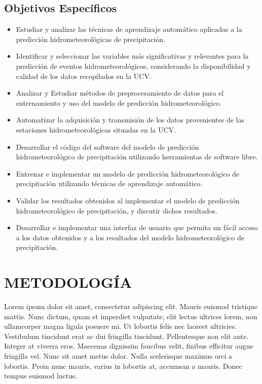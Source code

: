 \documentclass[stu, 12pt, helv, letterpaper, donotrepeattitle, floatsintext, natbib]{apa7}
\begin{document}
\subsection*{Objetivos Específicos}

\begin{itemize}
    \item Estudiar y analizar las técnicas de aprendizaje automático aplicadas a la predicción hidrometeorológicas de precipitación.
    \item Identificar y seleccionar las variables más significativas y relevantes para la predicción de eventos hidrometeorológicos, considerando la disponibilidad y calidad de los datos recopilados en la UCV.
    \item Analizar y Estudiar métodos de preprocesamiento de datos para el entrenamiento y uso del modelo de predicción hidrometeorológico.
    \item Automatizar la adquisición y transmisión de los datos provenientes de las estaciones hidrometeorológicas situadas en la UCV.
    \item Desarrollar el código del software del modelo de predicción hidrometeorológico de precipitación utilizando herramientas de software libre. 
    \item Entrenar e implementar un modelo de predicción hidrometeorológico de precipitación utilizando técnicas de aprendizaje automático.
    \item Validar los resultados obtenidos al implementar el modelo de predicción hidrometeorológico de precipitación, y discutir dichos resultados.
    \item Desarrollar e implementar una interfaz de usuario que permita un fácil acceso a los datos obtenidos y a los resultados del modelo hidrometeorológico de precipitación.
\end{itemize}


\section*{METODOLOGÍA}

Lorem ipsum dolor sit amet, consectetur adipiscing elit. Mauris euismod tristique mattis. Nunc dictum, quam et imperdiet vulputate, elit lectus ultrices lorem, non ullamcorper magna ligula posuere mi. Ut lobortis felis nec laoreet ultricies. Vestibulum tincidunt erat ac dui fringilla tincidunt. Pellentesque non elit ante. Integer at viverra eros. Maecenas dignissim faucibus velit, finibus efficitur augue fringilla vel. Nunc sit amet metus dolor. Nulla scelerisque maximus orci a lobortis. Proin nunc mauris, varius in lobortis at, accumsan a mauris. Donec tempus euismod luctus.
\end{document}
